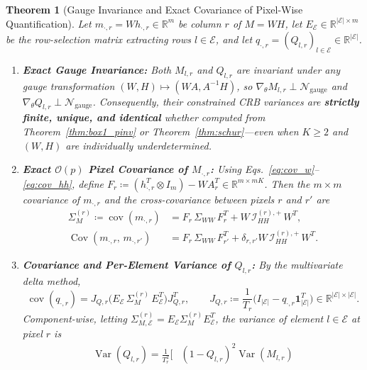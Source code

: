 \documentclass[11pt,a4paper]{article}
\theoremstyle{plain}
\newtheorem{theorem}{Theorem}[section]
\theoremstyle{definition}
\theoremstyle{remark}
\newcommand{\R}{\mathbb{R}}
\newcommand{\E}{\mathcal{E}}
\newcommand{\cN}{\mathcal{N}}
\newcommand{\cI}{\mathcal{I}}
\newcommand{\cov}{\operatorname{cov}}
\newcommand{\Var}{\operatorname{Var}}
\newcommand{\Cov}{\operatorname{Cov}}
\newcommand{\one}{\mathbf{1}}
\newcommand{\kron}{\otimes}
\begin{document}
\begin{theorem}[Gauge Invariance and Exact Covariance of Pixel-Wise Quantification]
\label{thm:pixel_quant}
Let $m_{\cdot, r} = W h_{\cdot, r} \in \R^m$ be column $r$ of $M = WH$, let $E_\E \in \R^{|\E| \times m}$ be the row-selection matrix extracting rows $l \in \E$, and let $q_{\cdot, r} = (Q_{l,r})_{l \in \E} \in \R^{|\E|}$.
\begin{enumerate}[leftmargin=1.5em]
    \item \textbf{Exact Gauge Invariance:} Both $M_{l,r}$ and $Q_{l,r}$ are invariant under any gauge transformation $(W, H) \mapsto (WA, A^{-1}H)$, so $\nabla_\theta M_{l,r} \perp \cN_{\text{gauge}}$ and $\nabla_\theta Q_{l,r} \perp \cN_{\text{gauge}}$. Consequently, their constrained CRB variances are \textbf{strictly finite, unique, and identical} whether computed from Theorem~\ref{thm:box1_pinv} or Theorem~\ref{thm:schur}—even when $K \ge 2$ and $(W,H)$ are individually underdetermined.
    \item \textbf{Exact $\mathcal{O}(p)$ Pixel Covariance of $M_{\cdot, r}$:} Using Eqs.~\eqref{eq:cov_w}--\eqref{eq:cov_hh}, define $F_r \coloneqq (h_{\cdot, r}^T \kron I_m) - W A_r^T \in \R^{m \times mK}$. Then the $m \times m$ covariance of $m_{\cdot, r}$ and the cross-covariance between pixels $r$ and $r'$ are
    \begin{align}
    \Sigma_M^{(r)} \coloneqq \cov(m_{\cdot, r}) &= F_r \, \Sigma_{WW} \, F_r^T + W \, \cI_{HH}^{(r),+} \, W^T, \label{eq:Sigma_M_r}\\
    \Cov(m_{\cdot, r},\, m_{\cdot, r'}) &= F_r \, \Sigma_{WW} \, F_{r'}^T + \delta_{r,r'} W \, \cI_{HH}^{(r),+} \, W^T. \label{eq:Sigma_M_rr}
    \end{align}
    \item \textbf{Covariance and Per-Element Variance of $Q_{l,r}$:} By the multivariate delta method,
    \begin{equation}
    \label{eq:cov_Q_r}
    \cov(q_{\cdot, r}) = J_{Q,r} \big(E_\E \, \Sigma_M^{(r)} \, E_\E^T\big) J_{Q,r}^T, \qquad J_{Q,r} \coloneqq \frac{1}{T_r} \Big( I_{|\E|} - q_{\cdot, r} \one_{|\E|}^T \Big) \in \R^{|\E| \times |\E|}.
    \end{equation}
    Component-wise, letting $\Sigma_{M,\E}^{(r)} = E_\E \Sigma_M^{(r)} E_\E^T$, the variance of element $l \in \E$ at pixel $r$ is
    \begin{equation}
    \label{eq:var_Q_lr}
    \begin{aligned}
    \Var(Q_{l,r}) = \frac{1}{T_r^2} \Bigg[
    &(1 - Q_{l,r})^2 \Var(M_{l,r})

\end{aligned}
\end{equation}
\end{enumerate}
\end{theorem}
\end{document}
